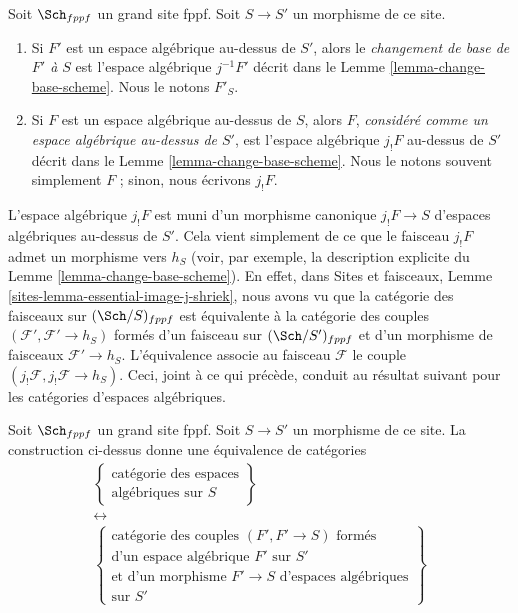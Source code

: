 \begin{definition}
\label{definition-base-change}
Soit $\Sch_{fppf}$ un grand site fppf.
Soit $S \to S'$ un morphisme de ce site.
\begin{enumerate}
\item Si $F'$ est un espace algébrique au-dessus de $S'$, alors le
{\it changement de base de $F'$ à $S$} est
l'espace algébrique $j^{-1}F'$ décrit dans le
Lemme \ref{lemma-change-base-scheme}. Nous le notons $F'_S$.
\item Si $F$ est un espace algébrique au-dessus de $S$, alors $F$,
{\it considéré comme un espace algébrique au-dessus de $S'$},
est l'espace algébrique $j_!F$ au-dessus de $S'$ décrit dans le
Lemme \ref{lemma-change-base-scheme}. Nous le notons souvent simplement
$F$ ; sinon, nous écrivons $j_!F$.
\end{enumerate}
\end{definition}

\noindent
L'espace algébrique $j_!F$ est muni d'un morphisme canonique
$j_!F \to S$ d'espaces algébriques au-dessus de $S'$. Cela vient simplement
de ce que le faisceau $j_!F$ admet un morphisme vers $h_S$ (voir, par exemple, la
description explicite du
Lemme \ref{lemma-change-base-scheme}).
En effet, dans
Sites et faisceaux, Lemme \ref{sites-lemma-essential-image-j-shriek},
nous avons vu que la catégorie des faisceaux sur $(\Sch/S)_{fppf}$
est équivalente à la catégorie des couples $(\mathcal{F}', \mathcal{F}' \to h_S)$
formés d'un faisceau sur $(\Sch/S')_{fppf}$ et d'un morphisme de faisceaux
$\mathcal{F}' \to h_S$. L'équivalence associe au faisceau $\mathcal{F}$
le couple $(j_!\mathcal{F}, j_!\mathcal{F} \to h_S)$.
Ceci, joint à ce qui précède, conduit au résultat suivant
pour les catégories d'espaces algébriques.

\begin{lemma}
\label{lemma-category-of-spaces-over-smaller-base-scheme}
Soit $\Sch_{fppf}$ un grand site fppf.
Soit $S \to S'$ un morphisme de ce site.
La construction ci-dessus donne une équivalence de
catégories
$$
\begin{gathered}
\left\{
\begin{matrix}
\text{catégorie des espaces}\\
\text{algébriques sur }S
\end{matrix}
\right\}\\[4pt]
\leftrightarrow\\[4pt]
\left\{
\begin{matrix}
\text{catégorie des couples }(F', F' \to S)\text{ formés}\\
\text{d'un espace algébrique }F'\text{ sur }S'\\
\text{et d'un morphisme }F' \to S\text{ d'espaces algébriques}\\
\text{sur }S'
\end{matrix}
\right\}
\end{gathered}
$$
\end{lemma}

